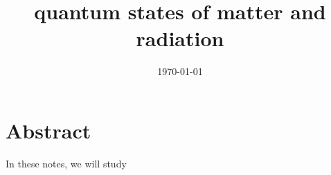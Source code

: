 \documentclass[a4paper, 12pt]{memoir}
\title{quantum states of matter and radiation}
\date{\today}
\begin{document}
\frontmatter



\tableofcontents

\mainmatter



\chapter*{Abstract}

    In these notes, we will study
    


\backmatter

\clearpage
{}
\printbibliography
\end{document}
